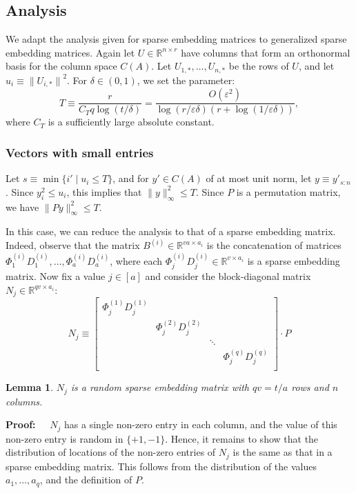 \documentclass{sig-alternate}
\newcommand{\norm}[1]{{\| #1 \|}}
\newcommand\scn{_{s:n}}
\newcommand\kv{a}
\newcommand\gdelta{\delta}
\newcommand{\eps}{\varepsilon}
\newcommand{\R}{{\mathbb R}}
\newtheorem{lemma}[theorem]{Lemma}
\def\FullBox{\hbox{\vrule width 8pt height 8pt depth 0pt}}
\def\qed{\ifmmode\qquad\FullBox\else{\unskip\nobreak\hfil
\penalty50\hskip1em\null\nobreak\hfil\FullBox
\parfillskip=0pt\finalhyphendemerits=0\endgraf}\fi}
\newenvironment{proof}{\begin{trivlist} \item {\bf Proof:~~}}
  {\qed\end{trivlist}}
\begin{document}
\subsection{Analysis}
We adapt the analysis given for sparse embedding matrices to generalized sparse embedding matrices.
Again let $U \in \mathbb{R}^{n \times r}$ have columns that form an
orthonormal basis for the column space $C(A)$. Let $U_{1, *}, \ldots, U_{n, *}$ be the rows
of $U$, and let $u_i\equiv \norm{U_{i,*}}^2$. For $\gdelta\in (0,1)$, we set the parameter:
\begin{equation}\label{eq:T JL}
T \equiv \frac{r}{C_Tq\log(t/\gdelta)} = \frac{O(\eps^2)}{\log(r/\eps\gdelta)(r + \log(1/\eps\gdelta))},
\end{equation}
where $C_T$ is a sufficiently large absolute constant. 

\subsubsection{Vectors with small entries}
Let $s\equiv \min\{i'\mid u_i \le T\}$, and for $y'\in C(A)$ of at most unit norm, let $y \equiv y'\scn$.
Since $y_i^2 \leq u_i$,
this implies that $\|y\|_{\infty}^2 \leq T$. Since $P$ is a permutation matrix, 
we have $\|Py\|_{\infty}^2 \leq T$. 

In this case, we can reduce the analysis to that of a sparse embedding matrix. Indeed, observe
that the matrix $B^{(i)}\in\R^{va\times a_i}$ is the concatenation of matrices 
$\Phi^{(i)}_1 D^{(i)}_1, \ldots, \Phi^{(i)}_{\kv} D^{(i)}_{\kv}$, where
each $\Phi^{(i)}_j D^{(i)}_j \in \R^{v\times a_i}$ is a sparse embedding matrix. Now fix a value $j \in [\kv]$ and consider
the block-diagonal matrix $N_j\in \R^{qv\times a_i}$:
\[
N_j \equiv \left[
\begin{matrix}
\Phi^{(1)}_j D^{(1)}_j & &\\
& \Phi^{(2)}_j D^{(2)}_j &&\\
&& \ddots & \\
&&& \Phi^{(q)}_j D^{(q)}_j \\
\end{matrix}
\right] \cdot P
\]
\begin{lemma}\label{lem:reduce}
$N_j$ is a random sparse embedding matrix with $qv = t/\kv$ rows and $n$ columns.
\end{lemma}
\begin{proof}
$N_j$ has a single non-zero entry in each column, and the value of this non-zero entry
is random in $\{+1, -1\}$. Hence, it remains to show that the distribution of locations
of the non-zero entries of $N_j$ is the same as that in a sparse embedding matrix. This follows
from the distribution of the values $a_1, \ldots, a_{q}$, and the definition of $P$. 
\end{proof}
\end{document}
